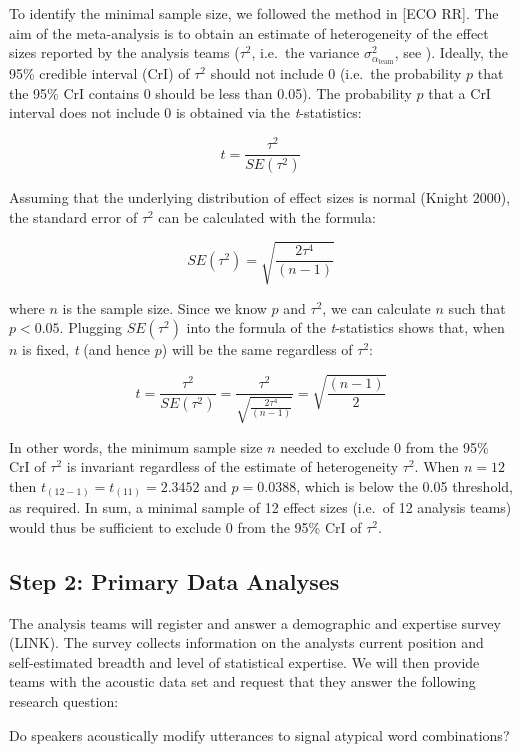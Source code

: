 \documentclass[
  english,
  man,floatsintext]{apa6}
\begin{document}
To identify the minimal sample size, we followed the method in {[}ECO RR{]}.
The aim of the meta-analysis is to obtain an estimate of heterogeneity of the effect sizes reported by the analysis teams (\(\tau^2\), i.e.~the variance \(\sigma^2_{\alpha_{\text{team}}}\), see ).
Ideally, the 95\% credible interval (CrI) of \(\tau^2\) should not include 0 (i.e.~the probability \(p\) that the 95\% CrI contains 0 should be less than 0.05).
The probability \(p\) that a CrI interval does not include 0 is obtained via the \emph{t}-statistics:

\[t = \frac{\tau^2}{SE(\tau^2)}\]

Assuming that the underlying distribution of effect sizes is normal (Knight 2000), the standard error of \(\tau^2\) can be calculated with the formula:

\[SE(\tau^2) = \sqrt{\frac{2\tau^4}{(n-1)}}\]

where \(n\) is the sample size.
Since we know \(p\) and \(\tau^2\), we can calculate \(n\) such that \(p < 0.05\).
Plugging \(SE(\tau^2)\) into the formula of the \emph{t}-statistics shows that, when \(n\) is fixed, \emph{t} (and hence \(p\)) will be the same regardless of \(\tau^2\):

\[t = \frac{\tau^2}{SE(\tau^2)} = \frac{\tau^2}{\sqrt{\frac{2\tau^4}{(n-1)}}} = \sqrt{\frac{(n-1)}{2}}\]

In other words, the minimum sample size \(n\) needed to exclude 0 from the 95\% CrI of \(\tau^2\) is invariant regardless of the estimate of heterogeneity \(\tau^2\).
When \(n = 12\) then \(t_{(12-1)} = t_{(11)} = 2.3452\) and \(p = 0.0388\), which is below the 0.05 threshold, as required.
In sum, a minimal sample of 12 effect sizes (i.e.~of 12 analysis teams) would thus be sufficient to exclude 0 from the 95\% CrI of \(\tau^2\).

\hypertarget{step-2-primary-data-analyses}{%
\subsection{Step 2: Primary Data Analyses}\label{step-2-primary-data-analyses}}

The analysis teams will register and answer a demographic and expertise survey (LINK).
The survey collects information on the analysts current position and self-estimated breadth and level of statistical expertise.
We will then provide teams with the acoustic data set and request that they answer the following research question:

Do speakers acoustically modify utterances to signal atypical word combinations?
\end{document}

